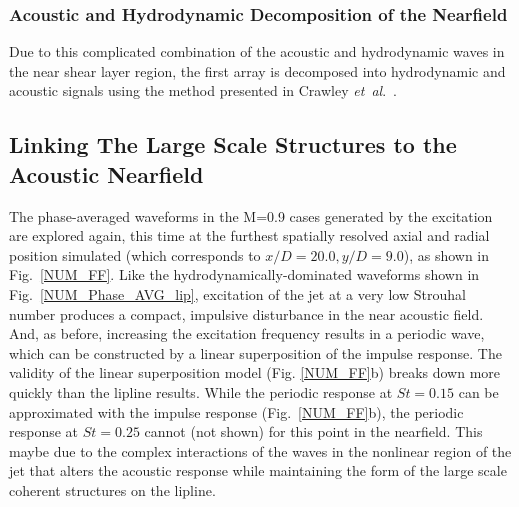 \documentclass[english]{aiaa-tc}
\newcommand*{\etal}{\textit{et~al}.\ }
\begin{document}
\subsubsection{Acoustic and Hydrodynamic Decomposition of the Nearfield}
Due to this complicated combination of the acoustic and hydrodynamic waves in the near shear layer region, the first array is decomposed into hydrodynamic and acoustic signals using the method presented in Crawley \etal \cite{Crawley2014}.

\subsection{Linking The Large Scale Structures to the Acoustic Nearfield}\label{sect:num_LLS2ANF}
The phase-averaged waveforms in the M=0.9 cases generated by the excitation are explored again, this time at the furthest spatially resolved axial and radial position simulated (which corresponds to $x/D = 20.0, y/D = 9.0$), as shown in Fig.~\ref{NUM_FF}.
Like the hydrodynamically-dominated waveforms shown in Fig.~\ref{NUM_Phase_AVG_lip}, excitation of the jet at a very low Strouhal number produces a compact, impulsive disturbance in the near acoustic field.
And, as before, increasing the excitation frequency results in a periodic wave, which can be constructed by a linear superposition of the impulse response.
The validity of the linear superposition model (Fig. \ref{NUM_FF}b) breaks down more quickly than the lipline results.
While the periodic response at $St = 0.15$ can be approximated with the impulse response (Fig.~\ref{NUM_FF}b), the periodic response at $St = 0.25$ cannot (not shown) for this point in the nearfield. This maybe due to the complex interactions of the waves in the nonlinear region of the jet that alters the acoustic response while maintaining the form of the large scale coherent structures on the lipline.
\end{document}
